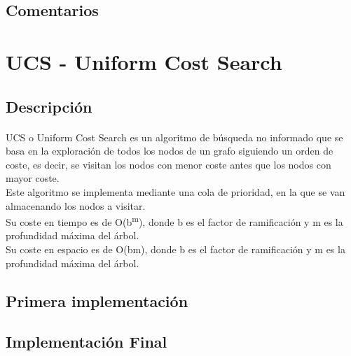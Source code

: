 \documentclass{report}
\begin{document}
        \subsection*{Comentarios}
      \clearpage\section{UCS - Uniform Cost Search}
        \subsection*{Descripción}
          \paragraph*{}{
            UCS o Uniform Cost Search es un algoritmo de búsqueda no informado que se basa en la exploración de todos los nodos de un grafo siguiendo un orden de coste, es decir, se visitan los nodos con menor coste antes que los nodos con mayor coste.\\
            Este algoritmo se implementa mediante una cola de prioridad, en la que se van almacenando los nodos a visitar.\\
            Su coste en tiempo es de O(b\textsuperscript{m}), donde b es el factor de ramificación y m es la profundidad máxima del árbol.\\
            Su coste en espacio es de O(bm), donde b es el factor de ramificación y m es la profundidad máxima del árbol.\\
          }
        \subsection*{Primera implementación}
          \paragraph*{}{

          }
        \subsection*{Implementación Final}
\end{document}
